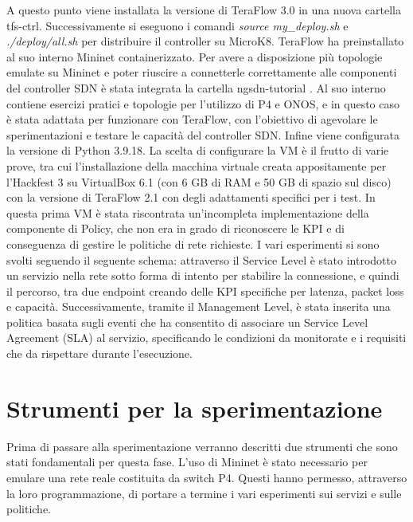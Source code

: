 A questo punto viene installata la versione di TeraFlow 3.0 in una nuova cartella tfs-ctrl.
Successivamente si eseguono i comandi \textit{source my\_deploy.sh} e \textit{./deploy/all.sh} per distribuire il controller su MicroK8.
TeraFlow ha preinstallato al suo interno Mininet containerizzato.
Per avere a disposizione più topologie emulate su Mininet e poter riuscire a connetterle correttamente alle componenti del controller SDN è stata integrata
la cartella ngsdn-tutorial \cite{ngsdn}. 
Al suo interno contiene esercizi pratici e topologie per l'utilizzo di P4 e ONOS, e in questo caso è stata adattata per funzionare con TeraFlow, 
con l'obiettivo di agevolare le sperimentazioni e testare le capacità del controller SDN. 
Infine viene configurata la versione di Python 3.9.18.
\newline La scelta di configurare la VM è il frutto di varie prove, tra cui l'installazione della macchina virtuale creata appositamente per l'Hackfest 3
su VirtualBox 6.1 (con 6 GB di RAM e 50 GB di spazio sul disco) con la versione di TeraFlow 2.1 con degli adattamenti specifici per i test.
In questa prima VM è stata riscontrata un'incompleta implementazione della componente di Policy, che non era in grado di riconoscere le KPI e di conseguenza di gestire le politiche di rete richieste.
\newline I vari esperimenti si sono svolti seguendo il seguente schema:
attraverso il Service Level è stato introdotto un servizio nella rete sotto forma di intento per stabilire la connessione, e quindi il percorso, tra due endpoint creando delle KPI 
specifiche per latenza, packet loss e capacità. 
Successivamente, tramite il Management Level, è stata inserita una politica basata sugli eventi che ha consentito di associare un Service Level Agreement (SLA) al servizio,
specificando le condizioni da monitorate e i requisiti che da rispettare durante l'esecuzione.
\section{Strumenti per la sperimentazione}
Prima di passare alla sperimentazione verranno descritti due strumenti che sono stati fondamentali per questa fase.
L'uso di Mininet è stato necessario per emulare una rete reale costituita da switch P4.
Questi hanno permesso, attraverso la loro programmazione, di portare a termine i vari esperimenti sui 
servizi e sulle politiche.
